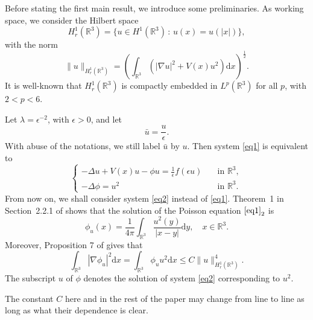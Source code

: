 \documentclass[12pt]{amsart}
\numberwithin{equation}{section}
\theoremstyle{definition}
\begin{document}
Before stating the first main result, we introduce some preliminaries.
As  working space, we consider the Hilbert space 
\begin{equation*}
	H^1_r(\mathbb R^3)=\{u\in H^1(\mathbb{R}^3)\,:\,u(x)=u(|x|)\},
\end{equation*}
with the norm
\begin{equation*}
	\|u\|_{H^1_r(\mathbb R^3)}=\left(\int_{\mathbb{R}^3}\left(|\nabla u|^2+V(x)u^2\right)\mbox{d}x\right)^{\frac{1}{2}}.
\end{equation*}
It is well-known that $H^1_r(\mathbb R^3)$ is compactly embedded in $L^p(\mathbb{R}^3)$ for all $p$, with $2<p<6$.

Let $\lambda=\epsilon^{-2}$, with $\epsilon>0$, and let
 \begin{equation*}
	\bar u=\frac{u}{\epsilon}.
	\end{equation*}
With abuse of the notations, we still label $\bar u$ by $u$. Then system \eqref{eq1} is equivalent to  
\begin{equation}\label{eq2}
	\begin{cases}
-\Delta u+V(x) u-\phi u=\frac{1}{\epsilon}f(\epsilon u)&\quad\text{in }\mathbb R^3,\\
-\Delta\phi= u^2&\quad\text{in }\mathbb R^3.
\end{cases}
\end{equation}
From now on, we shall consider system \eqref{eq2} 
instead of \eqref{eq1}. Theorem~1 in Section~2.2.1
of \cite{MR2597943} shows that the solution of
the  Poisson equation $\eqref{eq1}_2$ is
\begin{equation}\label{eq4}
	\phi_u(x)=\frac{1}{4\pi}\int_{\mathbb R^3}\frac{u^2(y)}{|x-y|}\text{d}y,\quad x\in\mathbb R^3.
\end{equation}
Moreover, Proposition 7 of \cite{MR3148130} gives that
\begin{equation}\label{phi_estimate}
	\int_{\mathbb{R}^3}|\nabla\phi_u|^2\text{d}x=\int_{\mathbb R^3}\phi_uu^2\text{d}x\leq C\|u\|_{H^1_r(\mathbb R^3)}^4.
\end{equation}
The subscript $u$ of $\phi$ denotes the solution of system \eqref{eq2}  corresponding to $u^2$. 

The constant $C$ here and in the rest of the paper may change from line to line as long as what their dependence is clear.
\end{document}
